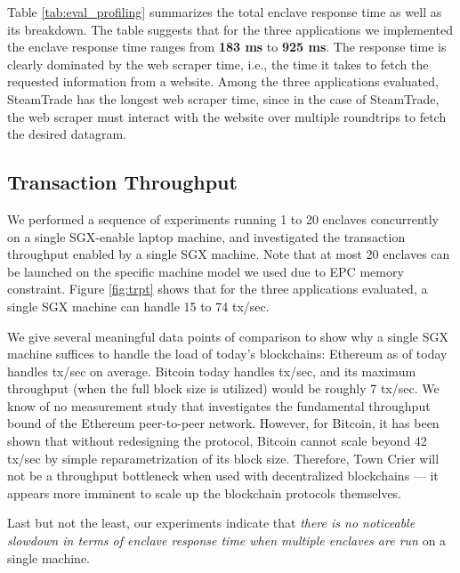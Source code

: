 Table \ref{tab:eval_profiling} summarizes the total enclave response time as
well as its breakdown.  The table suggests that for the three applications we
implemented the enclave response time ranges from {\bf 183 ms} to {\bf 925 ms}.
The response time is clearly dominated by the web scraper time, i.e., the time
it takes to fetch the requested information from a website.  Among the three
applications evaluated, {\sf SteamTrade} has the longest web scraper time, since
in the case of {\sf SteamTrade}, the web scraper must interact with the website
over multiple roundtrips to fetch the desired datagram.

\subsection{Transaction Throughput}
We performed a sequence of experiments running 1 to 20 enclaves 
concurrently
on a single SGX-enable laptop
machine, and investigated the transaction throughput 
enabled by a single SGX machine. 
Note that at most 20 \tc enclaves can be launched
on the specific machine model we used due to EPC memory
constraint.
Figure \ref{fig:trpt}
shows that for the three applications evaluated,
a single SGX machine can handle
15 to 74
tx/sec.

We give several meaningful data points of comparison to show
why a single SGX machine suffices to handle the load of
today's blockchains: 
Ethereum as of today handles 
 tx/sec on average. 
Bitcoin today handles
 tx/sec, and 
its maximum throughput (when the full block size is utilized)
would be roughly 7 tx/sec.
We know of no measurement study that 
investigates the fundamental 
throughput bound of the Ethereum  peer-to-peer network.
However, for Bitcoin, it has been shown that without
redesigning the protocol, 
Bitcoin cannot scale beyond  
42 tx/sec  by simple reparametrization of its block size.
Therefore, Town Crier will not be a throughput 
bottleneck when used 
with decentralized blockchains --- it appears 
more imminent to scale up 
the blockchain protocols themselves.

Last but not the least, our experiments indicate
that {\it there is no noticeable slowdown in terms of enclave
response time when multiple enclaves are run} on a single machine.

